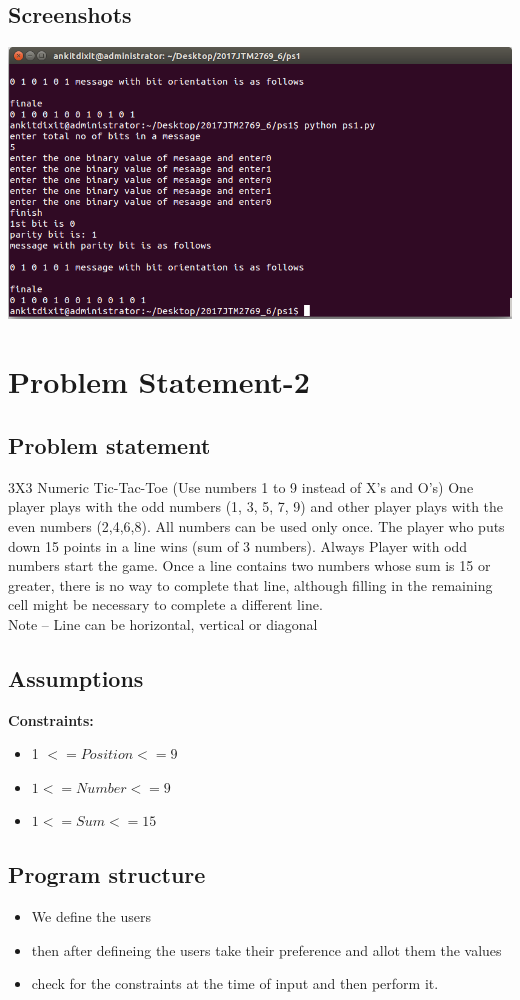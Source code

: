 \documentclass[12]{article}
\begin{document}
\subsection{Screenshots}
\includegraphics[scale=0.5]{ps1.png}

\newpage
\section{Problem Statement-2}

\subsection{Problem statement} 
3X3 Numeric Tic-Tac-Toe (Use numbers 1 to 9 instead of X’s and O’s)
One player plays with the odd numbers (1, 3, 5, 7, 9) and other player plays with the even numbers (2,4,6,8). All numbers can be used only once. The player who puts down 15 points in a line wins (sum of 3 numbers). Always Player with odd numbers start the game. Once a line contains two numbers whose sum is 15 or greater, there is no way to complete that line, although filling in the remaining cell might be necessary to complete a different line. \\
Note – Line can be horizontal, vertical or diagonal


\subsection{Assumptions}
\textbf{Constraints:}
\begin{itemize}
\item 1 $<= Position<=9$
\item $1<=Number<=9$
\item $1<=Sum<=15$
\end{itemize}


\subsection{Program structure}
\begin{itemize}
\item We define the users 
\item then after defineing the users take their preference and allot them the values
\item check for the constraints at the time of input and then perform it.
\end{itemize}
\end{document}
